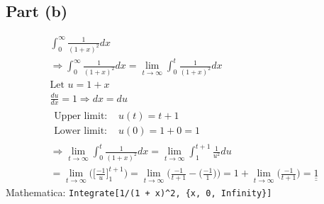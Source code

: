\documentclass[letterpaper,10pt]{article}
\newcommand{\doubleu}[1]{\underline{\underline{#1}}}
\newcommand{\mathematica}[1]{Mathematica: \texttt{#1}}
\begin{document}
		\subsection{Part (b)}
			\begin{gather*}
				\int_{0}^{\infty} \frac{1}{(1+x)^2} dx \\
				\Rightarrow \int_{0}^{\infty} \frac{1}{(1+x)^2} dx = \lim_{t \rightarrow \infty} \int_{0}^{t} \frac{1}{(1+x)^2} dx \\
				\text{Let } u = 1 + x \\
				\frac{du}{dx} = 1
				\Rightarrow dx=du \\
				\begin{aligned}
					\text{Upper limit: } &u(t) = t+1 \\
					\text{Lower limit: } &u(0) = 1+0 = 1
				\end{aligned}
				\\ \Rightarrow \lim_{t \rightarrow \infty} \int_{0}^{t} \frac{1}{(1+x)^2} dx
				= \lim_{t \rightarrow \infty} \int_{1}^{t+1} \frac{1}{u^2} du \\
				= \lim_{t \rightarrow \infty} \Bigg( \bigg[ \frac{-1}{u} \bigg]_{1}^{t+1} \Bigg)
				= \lim_{t \rightarrow \infty} \Bigg( \frac{-1}{t+1} - \Big( \frac{-1}{1} \Big) \Bigg)
				= 1 + \lim_{t \rightarrow \infty} \Bigg( \frac{-1}{t+1} \Bigg)
				= \doubleu{1}
			\end{gather*}
			\mathematica{Integrate[1/(1 + x)\^{}2, \{x, 0, Infinity\}]}
\end{document}
